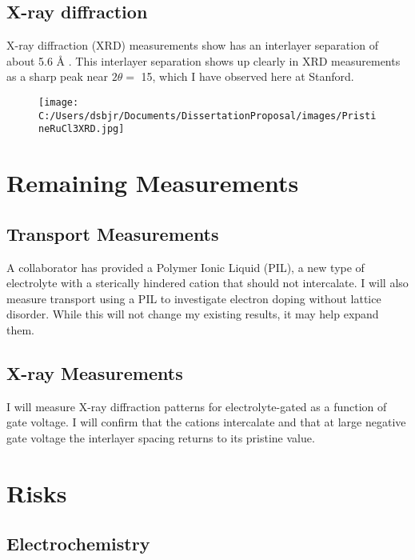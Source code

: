 \documentclass[11pt]{article}
\begin{document}
\subsection{X-ray diffraction}

X-ray diffraction (XRD) measurements show \rucl has an interlayer separation of about 5.6 \r{A} \cite{Schollhorn1983}. This interlayer separation shows up clearly in XRD measurements as a sharp peak near $2\theta = $ 15\degree, which I have observed here at Stanford.

\begin{figure}
 \centering
	{\texttt{[image: C:/Users/dsbjr/Documents/DissertationProposal/images/PristineRuCl3XRD.jpg]}}
  \captionsetup{width=0.5\textwidth}
  \label{fig:f8}
\end{figure}

\section{Remaining Measurements}

\subsection{Transport Measurements}

A collaborator has provided a Polymer Ionic Liquid (PIL), a new type of electrolyte with a sterically hindered cation that should not intercalate. I will also measure transport using a PIL to investigate electron doping without lattice disorder. While this will not change my existing results, it may help expand them.

\subsection{X-ray Measurements}

I will measure X-ray diffraction patterns for electrolyte-gated \rucl as a function of gate voltage. I will confirm that the cations intercalate and that at large negative gate voltage the interlayer spacing returns to its pristine value.

\section{Risks}

\subsection{Electrochemistry}
\end{document}
